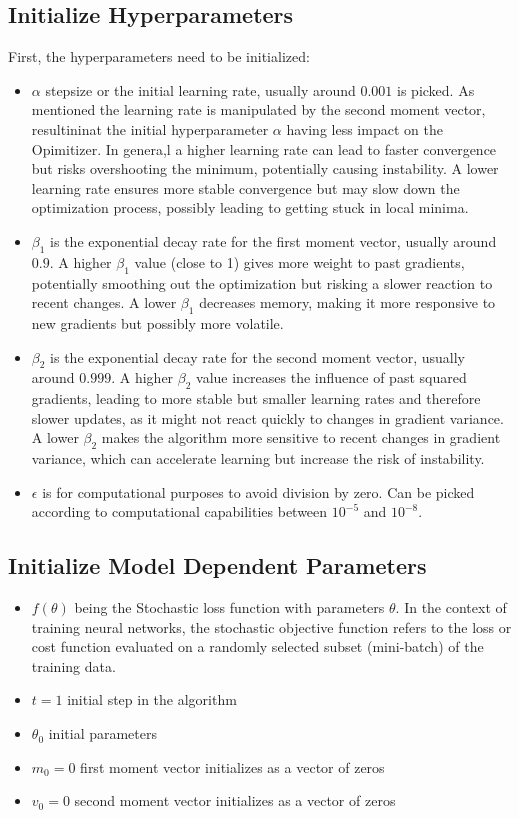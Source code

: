 \documentclass[oneside]{article}
\begin{document}
\subsection{Initialize Hyperparameters}
First, the hyperparameters need to be initialized:
\begin{itemize}
    \item $\alpha$ stepsize or the initial learning rate, usually around $0.001$ is picked. As mentioned the learning rate is manipulated by the second moment vector, resultininat the initial hyperparameter $\alpha$ having less impact on the Opimitizer. In genera,l a higher learning rate can lead to faster convergence but risks overshooting the minimum, potentially causing instability. A lower learning rate ensures more stable convergence but may slow down the optimization process, possibly leading to getting stuck in local minima. 
    \item $\beta_1$ is the exponential decay rate for the first moment vector, usually around $0.9$. A higher \(\beta_1\) value (close to 1) gives more weight to past gradients, potentially smoothing out the optimization but risking a slower reaction to recent changes. A lower \(\beta_1\) decreases memory, making it more responsive to new gradients but possibly more volatile.
    \item $\beta_2$ is the exponential decay rate for the second moment vector, usually around $0.999$. A higher \(\beta_2\) value increases the influence of past squared gradients, leading to more stable but smaller learning rates and therefore slower updates, as it might not react quickly to changes in gradient variance. A lower \(\beta_2\) makes the algorithm more sensitive to recent changes in gradient variance, which can accelerate learning but increase the risk of instability.
    \item $\epsilon$ is for computational purposes to avoid division by zero. Can be picked according to computational capabilities between $10^{-5}$ and $10^{-8}$.
\end{itemize}
\subsection{Initialize Model Dependent Parameters}
\begin{itemize}
    \item $f(\theta)$ being the Stochastic loss function with parameters $\theta$. In the context of training neural networks, the stochastic objective function refers to the loss or cost function evaluated on a randomly selected subset (mini-batch) of the training data.
    \item $t=1$ initial step in the algorithm
    \item $\theta_0$ initial parameters
    \item $m_0=0$ first moment vector initializes as a vector of zeros
    \item $v_0=0$ second moment vector initializes as a vector of zeros
\end{itemize}
\end{document}
